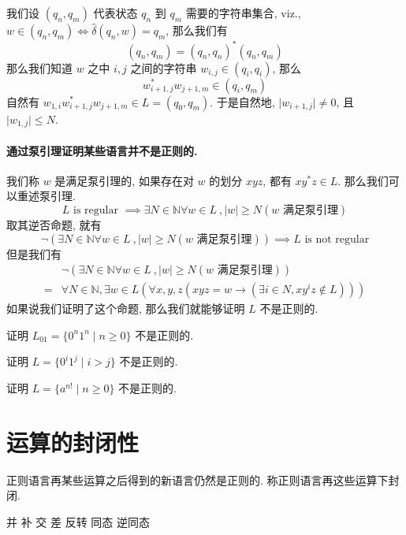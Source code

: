 \documentclass[../main_part1.tex]{subfiles}
\begin{document}
我们设 \( (q_n , q_{m})\) 代表状态 \(q _{n}\) 到 \(q _{m}\) 需要的字符串集合, viz., \(w  \in  (q _{n}, q _{m})\iff \hat\delta (q_{n}, w) =  q_{m} \), 那么我们有 \[ (q _{n}, q_{m}) = ( q _{n} ,  q_{n}) ^{*}(q_{n} , q_{m}) \]
那么我们知道 \(w\) 之中 \(i, j\) 之间的字符串 \(w _{i, j} \in (q _{i} , q _{i})\), 那么 
\[ w_{i+1 , j} ^{*}  w _{j + 1, m} \in (q_{i}, q_{m})\]
自然有 \(w_{1 , i} w _{i + 1 , j}^{*} w _{j + 1 , m} \in L = (q_{0}, q_{m})\). 
于是自然地, \(\vert w _{i + 1, j}\vert \ne 0 \), 且 \(\vert w _{1, j}\vert \le N\). 

\paragraph{通过泵引理证明某些语言并不是正则的. }
我们称 \(w\) 是满足泵引理的, 如果存在对 \(w\) 的划分 \(x yz\), 都有 \(x y ^{*} z \in L \). 那么我们可以重述泵引理.  
\[
	L \text{ is regular } \implies 
	\exists N \in \mathbb{N}
	\forall w\in L \ , |w | \ge N  (w\text{ 满足泵引理})
\]
取其逆否命题, 就有 
\[
	\neg (\exists N \in \mathbb{N}
	\forall w\in L \ , |w | \ge N  (w\text{ 满足泵引理}) ) 
	\implies 
	L \text{ is not regular}
\]
但是我们有 
\[
\begin{aligned}
	& \neg (\exists N \in \mathbb{N}
	\forall w\in L \ , |w | \ge N  (w\text{ 满足泵引理}) )  \\
	= 
	& \forall N \in \mathbb{N} , \exists w \in L (\forall x, y , z (xyz = w \to (\exists i \in N, xy^{i}z \notin L )))
\end{aligned}
\]
如果说我们证明了这个命题, 那么我们就能够证明 \(L\) 不是正则的. 

\begin{exam}\label{eg:ifelse}
证明 \(L_{01}  = \{ 0 ^{n } 1 ^{n} \mid n \ge 0\}\) 不是正则的. 
\end{exam}
\begin{exam}
证明 \(L = \{ 0 ^{i}  1 ^{j} \mid i > j \} \) 不是正则的. 
\end{exam}
\begin{exam}
证明 \(L = \{ a ^{n !} \mid n \ge 0\}\) 不是正则的. 
\end{exam}

\section{运算的封闭性}\label{sec:feng}
正则语言再某些运算之后得到的新语言仍然是正则的. 
称正则语言再这些运算下封闭. 



并
补
交
差
反转
同态
逆同态
\end{document}
